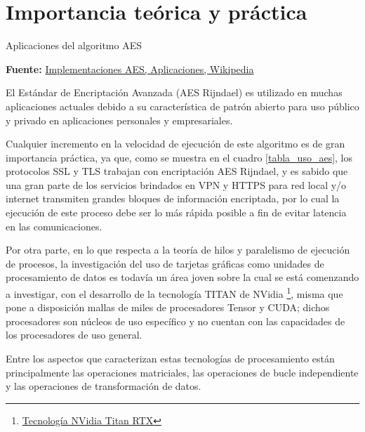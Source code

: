 \documentclass[../main/main.tex]{subfiles}
\begin{document}
  \section{Importancia teórica y práctica}

  \begin{table}
    \centering
    \caption{Aplicaciones del algoritmo AES}
    
    \caption*{\textbf{Fuente:} \href{https://en.wikipedia.org/wiki/AES_implementations}{Implementaciones AES, Aplicaciones, Wikipedia}}
    \label{tabla_uso_aes}
  \end{table}

  El Estándar de Encriptación Avanzada (AES Rijndael) es utilizado en muchas aplicaciones actuales debido a su característica de patrón abierto para uso público y privado en aplicaciones personales y empresariales.

  Cualquier incremento en la velocidad de ejecución de este algoritmo es de gran importancia práctica, ya que, como se muestra en el cuadro \ref{tabla_uso_aes}, los protocolos SSL y TLS trabajan con encriptación AES Rijndael, y es sabido que una gran parte de los servicios brindados en VPN y HTTPS para red local y/o internet transmiten grandes bloques de información encriptada, por lo cual la ejecución de este proceso debe ser lo más rápida posible a fin de evitar latencia en las comunicaciones.

  Por otra parte, en lo que respecta a la teoría de hilos y paralelismo de ejecución de procesos, la investigación del uso de tarjetas gráficas como unidades de procesamiento de datos es todavía un área joven sobre la cual se está comenzando a investigar, con el desarrollo de la tecnología TITAN de NVidia \footnote{\href{https://www.nvidia.com/en-us/titan/titan-rtx/}{Tecnología NVidia Titan RTX}}, misma que pone a disposición mallas de miles de procesadores Tensor y CUDA; dichos procesadores son núcleos de uso específico y no cuentan con las capacidades de los procesadores de uso general.

  Entre los aspectos que caracterizan estas tecnologías de procesamiento están principalmente las operaciones matriciales, las operaciones de bucle independiente y las operaciones de transformación de datos.
\end{document}
